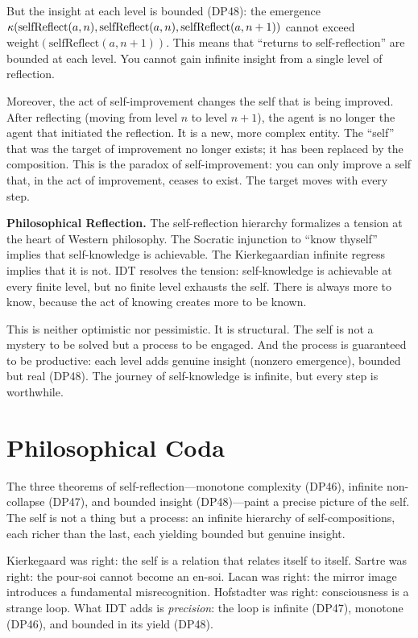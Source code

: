 But the insight at each level is bounded (DP48): the emergence
$\kappa(\mathrm{selfReflect}(a,n), \mathrm{selfReflect}(a,n),
\mathrm{selfReflect}(a,n+1))$ cannot exceed $\mathrm{weight}
(\mathrm{selfReflect}(a,n+1))$.  This means that ``returns to self-reflection''
are bounded at each level.  You cannot gain infinite insight from a single
level of reflection.

Moreover, the act of self-improvement changes the self that is being improved.
After reflecting (moving from level $n$ to level $n+1$), the agent is no
longer the agent that initiated the reflection.  It is a new, more complex
entity.  The ``self'' that was the target of improvement no longer exists;
it has been replaced by the composition.  This is the paradox of
self-improvement: you can only improve a self that, in the act of improvement,
ceases to exist.  The target moves with every step.

\begin{reflectionbox}
\noindent\textbf{Philosophical Reflection.}
The self-reflection hierarchy formalizes a tension at the heart of Western
philosophy.  The Socratic injunction to ``know thyself'' implies that
self-knowledge is achievable.  The Kierkegaardian infinite regress implies
that it is not.  IDT resolves the tension: self-knowledge is achievable at
every finite level, but no finite level exhausts the self.  There is always
more to know, because the act of knowing creates more to be known.

This is neither optimistic nor pessimistic.  It is structural.  The self is
not a mystery to be solved but a process to be engaged.  And the process is
guaranteed to be productive: each level adds genuine insight (nonzero
emergence), bounded but real (DP48).  The journey of self-knowledge is
infinite, but every step is worthwhile.
\end{reflectionbox}

\section{Philosophical Coda}

The three theorems of self-reflection---monotone complexity (DP46), infinite
non-collapse (DP47), and bounded insight (DP48)---paint a precise picture of
the self.  The self is not a thing but a process: an infinite hierarchy of
self-compositions, each richer than the last, each yielding bounded but
genuine insight.

Kierkegaard was right: the self is a relation that relates itself to itself.
Sartre was right: the pour-soi cannot become an en-soi.  Lacan was right: the
mirror image introduces a fundamental misrecognition.  Hofstadter was right:
consciousness is a strange loop.  What IDT adds is \emph{precision}: the loop
is infinite (DP47), monotone (DP46), and bounded in its yield (DP48).

